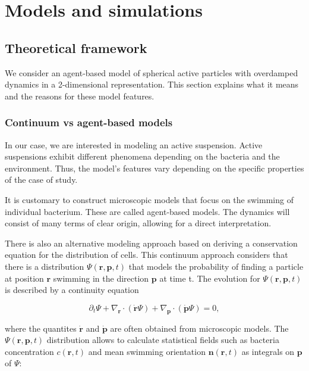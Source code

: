 \chapter{Models and simulations}

\section{Theoretical framework}

We consider an agent-based model of spherical active particles with overdamped dynamics in a 2-dimensional representation. This section explains what it means and the reasons for these model features.


\subsection{Continuum vs agent-based models} 

In our case, we are interested in modeling an active suspension. Active suspensions exhibit different phenomena depending on the bacteria and the environment. Thus, the model's features vary depending on the specific properties of the case of study. 

It is customary to construct microscopic models that focus on the swimming of individual bacterium. These are called agent-based models. The dynamics will consist of many terms of clear origin, allowing for a direct interpretation. 

There is also an alternative modeling approach based on deriving a conservation equation for the distribution of cells. This continuum approach considers that there is a distribution $\Psi(\textbf{r},\textbf{p},t)$ that models the probability of finding a particle at position $\textbf{r}$ swimming in the direction $\textbf{p}$ at time t. The evolution for $\Psi(\textbf{r},\textbf{p},t)$ is described by a continuity equation

\begin{equation}
\partial_t \Psi + \nabla_{\textbf{r}} \cdot ( \dot{\textbf{r}} \Psi ) + \nabla_{\textbf{p}} \cdot ( \dot{\textbf{p}} \Psi   ) = 0,
\end{equation}

where the quantites $\dot{\textbf{r}}$ and $\dot{\textbf{p}}$ are often obtained from microscopic models. The $\Psi(\textbf{r},\textbf{p},t)$ distribution allows to calculate statistical fields such as bacteria concentration $c(\textbf{r},t)$ and mean swimming orientation $\textbf{n}(\textbf{r},t)$ as integrals on $\textbf{p}$ of $\Psi$:

